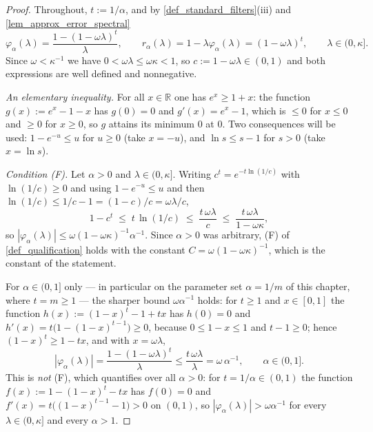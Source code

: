 \documentclass[a4paper]{report}
\theoremstyle{plain}
\theoremstyle{definition}
\theoremstyle{remark}
\begin{document}
\begin{proof}
  Throughout, $t := 1/\alpha$, and by \cref{def_standard_filters}(iii) and
  \cref{lem_approx_error_spectral}
  \[
    \varphi_{\alpha}(\lambda) = \frac{1 - (1-\omega\lambda)^{t}}{\lambda},
    \qquad
    r_{\alpha}(\lambda) = 1 - \lambda\varphi_{\alpha}(\lambda) = (1-\omega\lambda)^{t},
    \qquad \lambda \in (0,\kappa] .
  \]
  Since $\omega < \kappa^{-1}$ we have $0 < \omega\lambda \le \omega\kappa < 1$, so
  $c := 1 - \omega\lambda \in (0,1)$ and both expressions are well defined and
  nonnegative.

  \emph{An elementary inequality.}  For all $x \in \mathbb{R}$ one has $e^{x} \ge 1+x$:
  the function $g(x) := e^{x} - 1 - x$ has $g(0) = 0$ and $g'(x) = e^{x}-1$, which is
  $\le 0$ for $x \le 0$ and $\ge 0$ for $x \ge 0$, so $g$ attains its minimum $0$ at $0$.
  Two consequences will be used: $1 - e^{-u} \le u$ for $u \ge 0$ (take $x = -u$), and
  $\ln s \le s - 1$ for $s > 0$ (take $x = \ln s$).

  \emph{Condition (F).}  Let $\alpha > 0$ and $\lambda \in (0,\kappa]$.  Writing
  $c^{t} = e^{-t\ln(1/c)}$ with $\ln(1/c) \ge 0$ and using $1 - e^{-u} \le u$ and then
  $\ln(1/c) \le 1/c - 1 = (1-c)/c = \omega\lambda/c$,
  \[
    1 - c^{t} \;\le\; t\,\ln(1/c) \;\le\; \frac{t\,\omega\lambda}{c}
      \;\le\; \frac{t\,\omega\lambda}{1-\omega\kappa} ,
  \]
  so $|\varphi_{\alpha}(\lambda)| \le \omega(1-\omega\kappa)^{-1}\alpha^{-1}$.  Since
  $\alpha > 0$ was arbitrary, (F) of \cref{def_qualification} holds with the constant
  $C = \omega(1-\omega\kappa)^{-1}$, which is the constant of the statement.

  For $\alpha \in (0,1]$ only --- in particular on the parameter set $\alpha = 1/m$ of
  this chapter, where $t = m \ge 1$ --- the sharper bound $\omega\alpha^{-1}$ holds: for
  $t \ge 1$ and $x \in [0,1]$ the function $h(x) := (1-x)^{t} - 1 + tx$ has $h(0) = 0$
  and $h'(x) = t\bigl(1 - (1-x)^{t-1}\bigr) \ge 0$, because $0 \le 1-x \le 1$ and
  $t - 1 \ge 0$; hence $(1-x)^{t} \ge 1 - tx$, and with $x = \omega\lambda$,
  \[
    |\varphi_{\alpha}(\lambda)| = \frac{1 - (1-\omega\lambda)^{t}}{\lambda}
      \le \frac{t\,\omega\lambda}{\lambda} = \omega\,\alpha^{-1} ,
    \qquad \alpha \in (0,1] .
  \]
  This is \emph{not} (F), which quantifies over all $\alpha > 0$: for $t = 1/\alpha \in
  (0,1)$ the function $f(x) := 1 - (1-x)^{t} - tx$ has $f(0) = 0$ and
  $f'(x) = t\bigl((1-x)^{t-1} - 1\bigr) > 0$ on $(0,1)$, so
  $|\varphi_{\alpha}(\lambda)| > \omega\alpha^{-1}$ for every $\lambda \in (0,\kappa]$
  and every $\alpha > 1$.


\end{proof}
\end{document}
